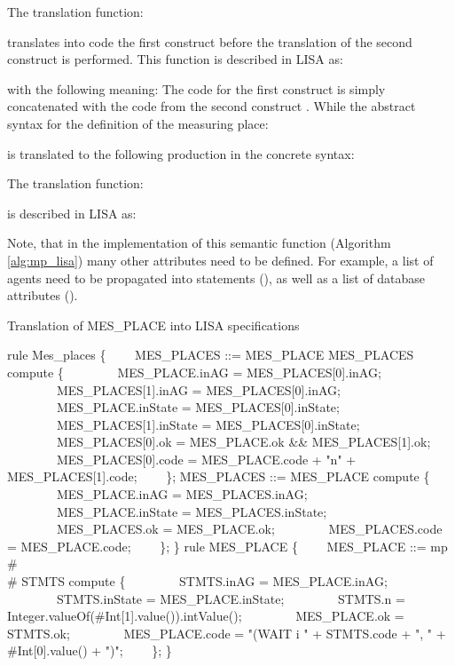 \documentclass[preprint, prX]{revtex4}
\begin{document}
\normalsize
The translation function:
\footnotesize

\normalsize
translates into code the first construct  before the translation of the second construct  is performed. This function is
described in LISA as:
\footnotesize


\normalsize
with the following meaning: The code for the first construct  is simply concatenated with the code from the second construct . While the abstract syntax for the definition of the measuring place:
\footnotesize

\normalsize
is translated to the following production in the concrete syntax:
\footnotesize

\normalsize
The translation function:
\footnotesize

\normalsize
is described in LISA as:
\footnotesize


\normalsize
Note, that in the implementation of this semantic function (Algorithm \ref{alg:mp_lisa}) many other attributes need to be defined. For
example, a list of agents need to be propagated into statements (), as well as a list of database attributes ().

\begin{algorithm}[tbh]
\caption{Translation of MES\_PLACE into LISA specifications}
\label{alg:mp_lisa}
\footnotesize
\begin{algorithmic}[1]
\STATE rule Mes\_places \{
\STATE \ \ \ \ MES\_PLACES ::= MES\_PLACE MES\_PLACES compute \{
\STATE \ \ \ \ \ \ \ \ MES\_PLACE.inAG = MES\_PLACES[0].inAG;
\STATE \ \ \ \ \ \ \ \ MES\_PLACES[1].inAG = MES\_PLACES[0].inAG;
\STATE \ \ \ \ \ \ \ \ MES\_PLACE.inState = MES\_PLACES[0].inState;
\STATE \ \ \ \ \ \ \ \ MES\_PLACES[1].inState = MES\_PLACES[0].inState;
\STATE \ \ \ \ \ \ \ \ MES\_PLACES[0].ok = MES\_PLACE.ok \&\& MES\_PLACES[1].ok;
\STATE \ \ \ \ \ \ \ \ MES\_PLACES[0].code = MES\_PLACE.code + "n" + \\\hspace{3.7cm} MES\_PLACES[1].code;
\STATE \ \ \ \ \};
\STATE MES\_PLACES ::=  MES\_PLACE compute \{
\STATE \ \ \ \ \ \ \ \ MES\_PLACE.inAG = MES\_PLACES.inAG;
\STATE \ \ \ \ \ \ \ \ MES\_PLACE.inState = MES\_PLACES.inState;
\STATE \ \ \ \ \ \ \ \ MES\_PLACES.ok = MES\_PLACE.ok;
\STATE \ \ \ \ \ \ \ \ MES\_PLACES.code = MES\_PLACE.code;
\STATE \ \ \ \ \};
\STATE \}
\STATE rule MES\_PLACE \{
\STATE \ \ \ \ MES\_PLACE ::= mp  \#   \\\hspace{2.7cm} 
 \#   STMTS  compute \{
\STATE \ \ \ \ \ \ \ \ STMTS.inAG = MES\_PLACE.inAG;
\STATE \ \ \ \ \ \ \ \ STMTS.inState = MES\_PLACE.inState;
\STATE \ \ \ \ \ \ \ \ STMTS.n = Integer.valueOf(\#Int[1].value()).intValue();
\STATE \ \ \ \ \ \ \ \ MES\_PLACE.ok = STMTS.ok;
\STATE \ \ \ \ \ \ \ \ MES\_PLACE.code = "(WAIT i " + STMTS.code + ", " + \\\hspace{3.2cm} \#Int[0].value() + ")";
\STATE \ \ \ \ \};
\STATE \}
\end{algorithmic}
\normalsize
\end{algorithm}
\end{document}
